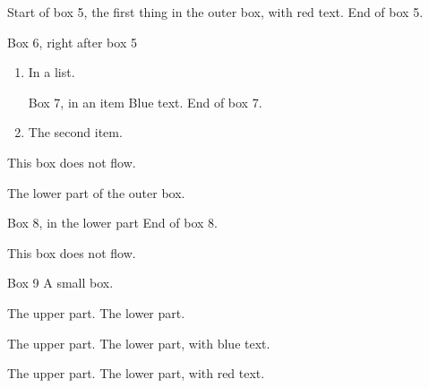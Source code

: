 \expandafter\documentclass\expandafter[\CLSOPT]{\CLS}
\begin{document}
\begin{tcolorbox}[breakable, title=Outer box 2]
\begin{tcolorbox}[breakable, colback=yellow!20, coltext=red!70!black]
Start of box 5, the first thing in the outer box, with red text.
End of box 5.
\end{tcolorbox}
\begin{note}{Box 6, right after box 5}
\end{note}
\begin{enumerate}
\item In a list. 
\begin{note}[coltext=blue!60!black]{Box 7, in an item}
Blue text. 
End of box 7.
\end{note}
\item The second item.
\end{enumerate}
\begin{minipage}{\linewidth}
\begin{tcolorbox}[breakable, colback=gray!20,
  title=In a minipage: an ordinary box]
This box does not flow.
\end{tcolorbox}
\end{minipage}
\tcblower
The lower part of the outer box. 
\begin{note}{Box 8, in the lower part}
End of box 8.
\end{note}
\end{tcolorbox}

\begin{tcolorbox}[title=An unbreakable outer box]
\begin{tcolorbox}[breakable, colback=gray!20,
  title=In an unbreakable box: an ordinary box]
This box does not flow.
\end{tcolorbox}
\end{tcolorbox}

\begin{tcolorbox}[breakable, title=Outer box 3 (not broken)]
\begin{note}{Box 9}
A small box.
\end{note}
\begin{tcolorbox}[breakable, colback=green!10, title=Box 10]
The upper part.
\tcblower
The lower part.
\end{tcolorbox}
\end{tcolorbox}

\begin{tcolorbox}[breakable, title=Outer box 4]
\begin{tcolorbox}[breakable, colback=yellow!20, title=Box 11,
  collower=blue!60!black]
The upper part. 
\tcblower
The lower part, with blue text. 
\end{tcolorbox}
\begin{tcolorbox}[breakable, bicolor, colback=red!10, colbacklower=cyan!15,
  title=Box 12, collower=red!60!black]
The upper part. 
\tcblower
The lower part, with red text. 
\end{tcolorbox}
\end{tcolorbox}

\end{document}
